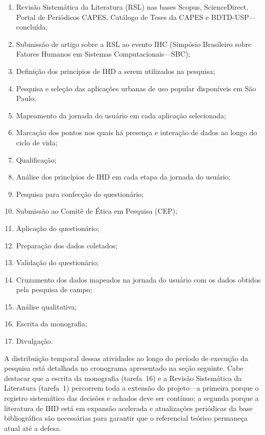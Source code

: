 \documentclass[
	12pt,				%
	oneside,			%
	a4paper,			%
	english,			%
	brazil				%
	]{abntex2ppgsi}
\begin{document}
  \begin{enumerate}
    \item Revisão Sistemática da Literatura (RSL) nas bases Scopus, ScienceDirect, Portal de Periódicos CAPES, Catálogo de Teses da CAPES e BDTD-USP---concluída;
    \item Submissão de artigo sobre a RSL ao evento IHC (Simpósio Brasileiro sobre Fatores Humanos em Sistemas Computacionais---SBC);
    \item Definição dos princípios de IHD a serem utilizados na pesquisa;
    \item Pesquisa e seleção das aplicações urbanas de uso popular disponíveis em São Paulo;
    \item Mapeamento da jornada do usuário em cada aplicação selecionada;
    \item Marcação dos pontos nos quais há presença e interação de dados ao longo do ciclo de vida;
    \item Qualificação;
    \item Análise dos princípios de IHD em cada etapa da jornada do usuário;
    \item Pesquisa para confecção do questionário;
    \item Submissão ao Comitê de Ética em Pesquisa (CEP);
    \item Aplicação do questionário;
    \item Preparação dos dados coletados;
    \item Validação do questionário;
    \item Cruzamento dos dados mapeados na jornada do usuário com os dados obtidos pela pesquisa de campo;
    \item Análise qualitativa;
    \item Escrita da monografia;
    \item Divulgação.
  \end{enumerate}

  A distribuição temporal dessas atividades ao longo do período de
  execução da pesquisa está detalhada no cronograma apresentado na
  seção seguinte. Cabe destacar que a escrita da monografia
  (tarefa~16) e a Revisão Sistemática da Literatura (tarefa~1)
  percorrem toda a extensão do projeto---a primeira porque o registro
  sistemático das decisões e achados deve ser contínuo; a segunda
  porque a literatura de IHD está em expansão acelerada e atualizações
  periódicas da base bibliográfica são necessárias para garantir que
  o referencial teórico permaneça atual até a defesa.
\end{document}
